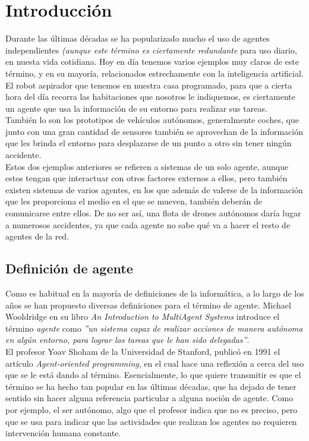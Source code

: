 \chapter{Introducción}
\label{chap:introduccion}

Durante las últimas décadas se ha popularizado mucho el uso de agentes independientes \textit{(aunque este término es ciertamente redundante} para uso diario, en nuesta vida cotidiana. Hoy en día tenemos varios ejemplos muy claros de este término, y en su mayoría, relacionados estrechamente con la inteligencia artificial.\\

El robot aspirador que tenemos en nuestra casa programado, para que a cierta hora del día recorra las habitaciones que nosotros le indiquemos, es ciertamente un agente que usa la información de su entorno para realizar sus tareas.\\

También lo son los prototipos de vehículos autónomos, generalmente coches, que junto con una gran cantidad de sensores también se aprovechan de la información que les brinda el entorno para desplazarse de un punto a otro sin tener ningún accidente.\\

Estos dos ejemplos anteriores se refieren a sistemas de un solo agente, aunque estos tengan que interactuar con otros factores externos a ellos, pero también existen sistemas de varios agentes, en los que además de valerse de la información que les proporciona el medio en el que se mueven, también deberán de comunicarse entre ellos. De no ser así, una flota de drones autónomos daría lugar a numerosos accidentes, ya que cada agente no sabe qué va a hacer el resto de agentes de la red.

\section{Definición de agente}

Como es habitual en la mayoría de definiciones de la informática, a lo largo de los años se han propuesto diversas definiciones para el término de agente. Michael Wooldridge en su libro \textit{An Introduction to MultiAgent Systems}\cite{wooldridge-2009} introduce el término \textit{agente} como \textit{''un sistema capaz de realizar acciones de manera autónoma en algún entorno, para lograr las tareas que le han sido delegadas''}.\\

El profesor Yoav Shoham de la Universidad de Stanford, publicó en 1991 el artículo \textit{Agent-oriented programming}\cite{Shoham}, en el cual hace una reflexión a cerca del uso que se le está dando al término. Esencialmente, lo que quiere transmitir es que el término se ha hecho tan popular en las últimas décadas, que ha dejado de tener sentido sin hacer alguna referencia particular a alguna noción de agente. Como por ejemplo, el ser autónomo, algo que el profesor indica que no es preciso, pero que se usa para indicar que las actividades que realizan los agentes no requieren intervención humana constante.\\

